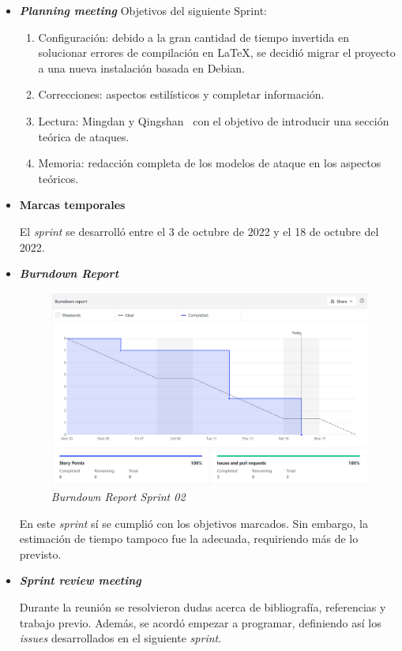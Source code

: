 \begin{itemize}
	\item \textbf{\textit{Planning meeting}}
	Objetivos del siguiente Sprint:
	
	\begin{enumerate}
		\item Configuración: debido a la gran cantidad de tiempo invertida en solucionar errores de compilación en \LaTeX{}, se decidió migrar el proyecto a una nueva instalación basada en Debian.
		\item Correcciones: aspectos estilísticos y completar información.
		\item Lectura: Mingdan y Qingshan~\cite{mingdan2018ShillingAttacksAReview} con el objetivo de introducir una sección teórica de ataques.
		\item Memoria: redacción completa de los modelos de ataque en los aspectos teóricos.
		
	\end{enumerate}
	
	\item \textbf{Marcas temporales}
	
	El \textit{sprint} se desarrolló entre el 3 de octubre de 2022 y el 18 de octubre del 2022.
	
	\item \textbf{\textit{Burndown Report}}
	\begin{figure}[h]
		\caption[\textit{Sprint} 02: \textit{burndown report}]{\textit{Burndown Report Sprint 02}}
		\centering
		\includegraphics[width=\textwidth]{../img/anexos/bdr/s02_bdr}
	\end{figure}
		
	En este \textit{sprint} sí se cumplió con los objetivos marcados. Sin embargo, la estimación de tiempo tampoco fue la adecuada, requiriendo más de lo previsto.
	
	\item \textbf{\textit{Sprint review meeting}}
	
	Durante la reunión se resolvieron dudas acerca de bibliografía, referencias y trabajo previo. Además, se acordó empezar a programar, definiendo así los \textit{issues} desarrollados en el siguiente \textit{sprint}.
	
\end{itemize}

